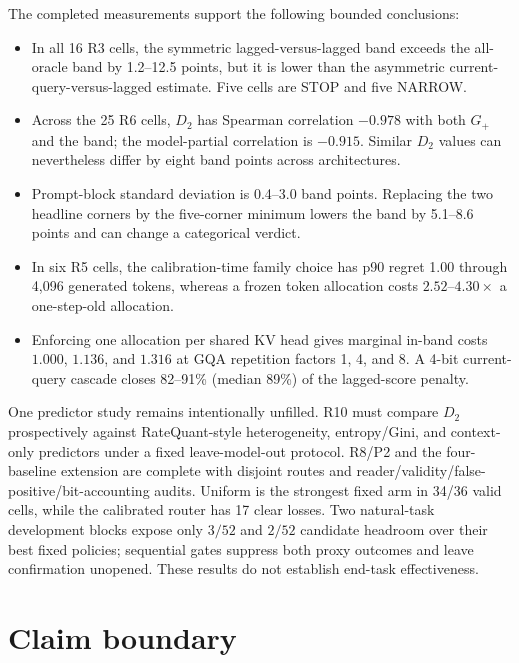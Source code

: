 The completed measurements support the following bounded conclusions:
\begin{itemize}
 \item In all 16 R3 cells, the symmetric lagged-versus-lagged band exceeds the
 all-oracle band by 1.2--12.5 points, but it is lower than the asymmetric
 current-query-versus-lagged estimate.  Five cells are STOP and five NARROW.
 \item Across the 25 R6 cells, $D_2$ has Spearman correlation $-0.978$ with both
 $G_+$ and the band; the model-partial correlation is $-0.915$.  Similar $D_2$
 values can nevertheless differ by eight band points across architectures.
 \item Prompt-block standard deviation is 0.4--3.0 band points.  Replacing the
 two headline corners by the five-corner minimum lowers the band by 5.1--8.6
 points and can change a categorical verdict.
 \item In six R5 cells, the calibration-time family choice has p90 regret 1.00
 through 4,096 generated tokens, whereas a frozen token allocation costs
 $2.52$--$4.30\times$ a one-step-old allocation.
 \item Enforcing one allocation per shared KV head gives marginal in-band costs
 $1.000$, $1.136$, and $1.316$ at GQA repetition factors 1, 4, and 8.  A 4-bit
 current-query cascade closes 82--91\% (median 89\%) of the lagged-score penalty.
\end{itemize}

One predictor study remains intentionally unfilled.  R10 must compare $D_2$
prospectively against RateQuant-style heterogeneity, entropy/Gini, and
context-only predictors under a fixed leave-model-out protocol.  R8/P2 and the
four-baseline extension are complete with disjoint routes and
reader/validity/false-positive/bit-accounting audits.  Uniform is the strongest
fixed arm in 34/36 valid cells, while the calibrated router has 17 clear losses.
Two natural-task development blocks expose only $3/52$ and $2/52$ candidate
headroom over their best fixed policies; sequential gates suppress both proxy
outcomes and leave confirmation unopened.  These results do not establish
end-task effectiveness.

\section{Claim boundary}
\label{app:claims}

